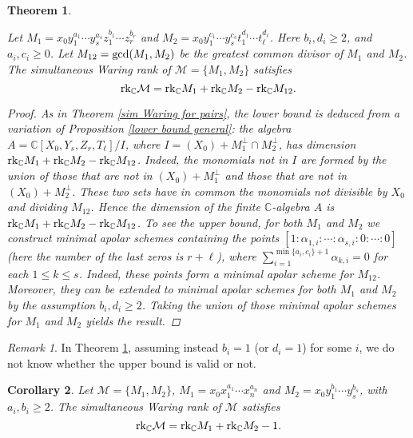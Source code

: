 \documentclass{amsart}
\theoremstyle{plain}
\newtheorem{theorem}{Theorem}[section]
\newtheorem{corollary}[theorem]{Corollary}
\theoremstyle{definition}
\theoremstyle{remark}
\newtheorem{remark}{Remark}[section]
\begin{document}
\begin{theorem}\label{notsamesupportpairs}

Let $M_1=x_0y_1^{a_1}\cdots y_s^{a_s}z_1^{b_1}\cdots z_r^{b_r}$ and $M_2=x_0y_1^{c_1}\cdots y_s^{c_s}t_1^{d_1}\cdots t_{\ell}^{d_{\ell}}$. Here $b_i, d_i\geq 2$, and $a_i, c_i \geq 0$. Let $M_{12}=\textnormal{gcd}(M_1,M_2)$ be the greatest common divisor of $M_1$ and $M_2$. The simultaneous Waring rank of $\mathcal M = \lbrace M_1, M_2\rbrace$ satisfies
$$
\textnormal{rk}_{\mathbb C} \mathcal M = \textnormal{rk}_{\mathbb C} M_1+\textnormal{rk}_{\mathbb C} M_2 - \textnormal{rk}_{\mathbb C} M_{12}.
$$
\begin{proof}
As in Theorem  \ref{sim Waring for pairs}, the lower bound is deduced from a variation of Proposition \ref{lower bound general}: the algebra $A = \mathbb C[X_0,Y_{s}, Z_{r}, T_{\ell}]/I$, where $I = (X_0)+M_1^{\perp}\cap M_2^{\perp}$, has dimension
$\textnormal{rk}_{\mathbb C} M_1+\textnormal{rk}_{\mathbb C} M_2 - \textnormal{rk}_{\mathbb C} M_{12}$. Indeed, the monomials not in $I$ are formed by the union of those that are not in $(X_0)+M_1^{\perp}$ and those that are not in $(X_0)+M_2^{\perp}$. These two sets have in common the monomials not divisible by $X_0$ and dividing $M_{12}$. Hence the dimension of the finite $\mathbb C$-algebra $A$ is $\textnormal{rk}_{\mathbb C} M_1+\textnormal{rk}_{\mathbb C} M_2 - \textnormal{rk}_{\mathbb C} M_{12}$. To see the upper bound, for both $M_1$ and $M_2$ we construct minimal apolar schemes containing the points $[1: \alpha_{1,i} : \cdots : \alpha_{s,i} : 0 : \cdots : 0]$ (here the number of the last zeros is $r+\ell$), where $\sum_{i=1}^{\min\lbrace a_i, c_i\rbrace+1} \alpha_{k,i} = 0$ for each $1\leq k\leq s$. Indeed, these points form a minimal apolar scheme for $M_{12}$. Moreover, they can be extended to minimal apolar schemes for both $M_1$ and $M_2$ by the assumption $b_i, d_i\geq 2$. Taking the union of those minimal apolar schemes for $M_1$ and $M_2$ yields the result.
\end{proof}
\end{theorem}

\begin{remark}
In Theorem \ref{notsamesupportpairs}, assuming instead $b_i = 1$ (or $d_i=1$) for some $i$, we do not know whether the upper bound is valid or not.
\end{remark}

\begin{corollary}
Let $\mathcal M= \lbrace M_1, M_2\rbrace$, $M_1=x_0x_1^{a_1}\cdots x_n^{a_n}$ and $M_2=x_0y_1^{b_1}\cdots y_s^{b_s}$, with $a_i,b_i\geq 2$. The simultaneous Waring rank of $\mathcal M$ satisfies
$$
\textnormal{rk}_{\mathbb C} \mathcal M = \textnormal{rk}_{\mathbb C} M_1+\textnormal{rk}_{\mathbb C} M_2 - 1.
$$
\end{corollary}
\end{document}
